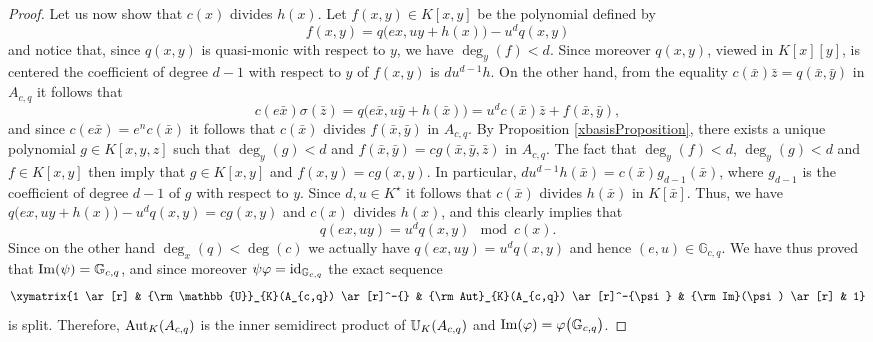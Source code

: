 \documentclass{article}
\newcommand \G {\mathbb{G}}
\renewcommand \a {A}
\renewcommand \k {K}
\newcommand \saut {{\rm \mathbb{U}}}
\newcommand \auto {{\rm Aut}}
\newcommand \image {{\rm Im}}
\begin{document}
{\begin{proof}
	\smallskip Let us now show that $c(x)$ divides $h(x)$. Let $f(x,y) \in \k[x,y]$ be the polynomial defined by $$f(x,y)=q\big(ex,uy+h(x)\big)-u^dq(x,y)$$ and notice that, since $q(x,y)$ is quasi-monic with respect to $y$, we have $\deg_y(f)<d$. Since moreover $q(x,y)$, viewed in $\k[x][y]$, is centered the coefficient of degree $d-1$ with respect to $y$ of $f(x,y)$ is $du^{d-1}h$. On the other hand, from the equality $c(\bar{x})\bar{z}=q(\bar{x},\bar{y})$ in $\a_{c,q}$ it follows that $$c(e\bar{x})\sigma(\bar{z})=q\big(e\bar{x},u\bar{y}+h(\bar{x})\big)=u^dc(\bar{x})\bar{z}+f(\bar{x},\bar{y}),$$ 
	and since $c(e\bar{x})=e^nc(\bar{x})$ it follows that $c(\bar{x})$ divides $f(\bar{x},\bar{y})$ in $\a_{c,q}$. By Proposition \ref{xbasisProposition}, there exists a unique polynomial $g\in \k[x,y,z]$ such that $\deg_y(g)<d$ and $f(\bar{x},\bar{y})=cg(\bar{x},\bar{y},\bar{z})$ in $\a_{c,q}$. The fact that $\deg_y(f)<d$, $\deg_y(g)<d$ and $f\in\k[x,y]$ then imply that $g\in\k[x,y]$ and $f(x,y)=cg(x,y)$. In particular, $du^{d-1}h(\bar{x})=c(\bar{x})g_{d-1}(\bar{x})$, where $g_{d-1}$ is the coefficient of degree $d-1$ of $g$ with respect to $y$. Since $d,u\in\k^{\star}$ it follows that $c(\bar{x})$ divides $h(\bar{x})$ in $\k[\bar{x}]$. Thus, we have $q\big(ex,uy+h(x)\big)-u^dq(x,y)=cg(x,y)$ and $c(x)$ divides $h(x)$, and this clearly implies that $$q(ex,uy)=u^dq(x,y)\mod c(x).$$ Since on the other hand $\deg_x(q)<\deg(c)$ we actually have $q(ex,uy)=u^dq(x,y)$ and hence $(e,u)\in\G_{c,q}$. We have thus proved that $\image(\psi)=\G_{c,q}$, and since moreover $\psi\varphi={\rm id}_{\G_{c,q}}$ the exact sequence $$\xymatrix{1 \ar[r] & \saut_{\k}(\a_{c,q}) \ar[r]^-{} & \auto_{\k}(\a_{c,q}) \ar[r]^-{\psi} & \image(\psi) \ar[r] & 1}$$ is split. Therefore, $\auto_{\k}(\a_{c,q})$ is the inner semidirect product of $\saut_{\k}(\a_{c,q})$ and $\image(\varphi)=\varphi\big(\G_{c,q}\big)$.
\end{proof}

}
\end{document}
